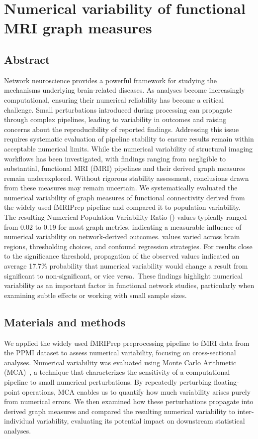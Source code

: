 \chapter{Numerical variability of functional MRI graph measures}
\label{chap:phase-one}

\section{Abstract}
Network neuroscience provides a powerful framework for studying the mechanisms underlying brain-related diseases. As analyses become increasingly computational, ensuring their numerical reliability has become a critical challenge. Small perturbations introduced during processing can propagate through complex pipelines, leading to variability in outcomes and raising concerns about the reproducibility of reported findings. Addressing this issue requires systematic evaluation of pipeline stability to ensure results remain within acceptable numerical limits. While the numerical variability of structural imaging workflows has been investigated, with findings ranging from negligible to substantial, functional MRI (fMRI) pipelines and their derived graph measures remain underexplored. Without rigorous stability assessment, conclusions drawn from these measures may remain uncertain. We systematically evaluated the numerical variability of graph measures of functional connectivity derived from the widely used fMRIPrep pipeline and compared it to population variability. The resulting Numerical-Population Variability Ratio (\npvratio{}) values typically ranged from 0.02 to 0.19 for most graph metrics, indicating a measurable influence of numerical variability on network-derived outcomes. \npvratio{} values varied across brain regions, thresholding choices, and confound regression strategies. For results close to the significance threshold, propagation of the observed \npvratio{} values indicated an average 17.7\% probability that numerical variability would change a result from significant to non-significant, or vice versa.\ These findings highlight numerical variability as an important factor in functional network studies, particularly when examining subtle effects or working with small sample sizes.
\section{Materials and methods}
We applied the widely used fMRIPrep preprocessing pipeline to fMRI data from the PPMI dataset to assess numerical variability, focusing on cross-sectional analyses. Numerical variability was evaluated using Monte Carlo Arithmetic (MCA)~\cite{Parker1997MCA,Denis2016Verificarlo}, a technique that characterizes the sensitivity of a computational pipeline to small numerical perturbations. By repeatedly perturbing floating-point operations, MCA enables us to quantify how much variability arises purely from numerical errors. We then examined how these perturbations propagate into derived graph measures and compared the resulting numerical variability to inter-individual variability, evaluating its potential impact on downstream statistical analyses.

